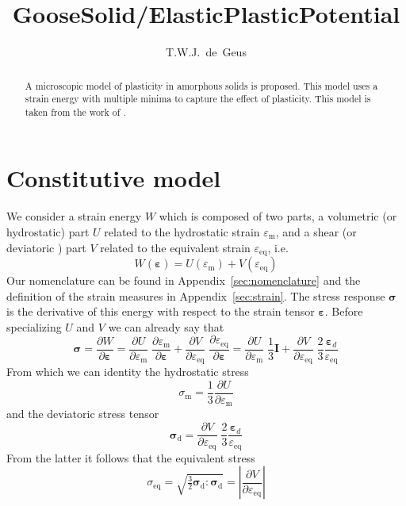 \documentclass[times,namecite]{goose-article}
\title{%
  GooseSolid/ElasticPlasticPotential
}
\author{T.W.J.~de~Geus}
\begin{document}
\maketitle

\begin{abstract}
A microscopic model of plasticity in amorphous solids is proposed. This model uses a strain energy with multiple minima to capture the effect of plasticity. This model is taken from the work of \citet{Jagla2017}.
\end{abstract}


\setcounter{tocdepth}{2}
\tableofcontents

\vfill\newpage
\section{Constitutive model}

We consider a strain energy $W$ which is composed of two parts, a volumetric (or hydrostatic) part $U$ related to the hydrostatic strain $\varepsilon_\mathrm{m}$, and a shear (or deviatoric ) part $V$ related to the equivalent strain $\varepsilon_\mathrm{eq}$, i.e.\
\begin{equation}
  W ( \bm{\varepsilon} ) = U ( \varepsilon_\mathrm{m} ) + V ( \varepsilon_\mathrm{eq} )
\end{equation}
Our nomenclature can be found in Appendix~\ref{sec:nomenclature} and the definition of the strain measures in Appendix~\ref{sec:strain}. The stress response $\bm{\sigma}$ is the derivative of this energy with respect to the strain tensor $\bm{\varepsilon}$. Before specializing $U$ and $V$ we can already say that
\begin{equation}
  \bm{\sigma}
  =
  \frac{\partial W}{\partial \bm{\varepsilon}}
  =
  \frac{\partial U}{\partial \varepsilon_\mathrm{m}} \;
  \frac{\partial \varepsilon_\mathrm{m}}{\partial \bm{\varepsilon}}
  +
  \frac{\partial V}{\partial \varepsilon_\mathrm{eq}} \;
  \frac{\partial \varepsilon_\mathrm{eq}}{\partial \bm{\varepsilon}}
  =
  \frac{\partial U}{\partial \varepsilon_\mathrm{m}} \;
  \frac{1}{3} \bm{I}
  +
  \frac{\partial V}{\partial \varepsilon_\mathrm{eq}} \;
  \frac{2}{3}
  \frac{\bm{\varepsilon}_d}{\varepsilon_\mathrm{eq}}
\end{equation}
From which we can identity the hydrostatic stress
\begin{equation}
  \sigma_\mathrm{m} = \frac{1}{3} \frac{\partial U}{\partial \varepsilon_\mathrm{m}}
\end{equation}
and the deviatoric stress tensor
\begin{equation}
  \bm{\sigma}_\mathrm{d}
  =
  \frac{\partial V}{\partial \varepsilon_\mathrm{eq}} \;
  \frac{2}{3}
  \frac{\bm{\varepsilon}_d}{\varepsilon_\mathrm{eq}}
\end{equation}
From the latter it follows that the equivalent stress
\begin{equation}\label{eq:sig_eq}
  \sigma_\mathrm{eq}
  =
  \sqrt{ \tfrac{3}{2} \bm{\sigma}_\mathrm{d} : \bm{\sigma}_\mathrm{d} }
  =
  \left| \frac{\partial V}{\partial \varepsilon_\mathrm{eq}} \right|
\end{equation}
\end{document}
